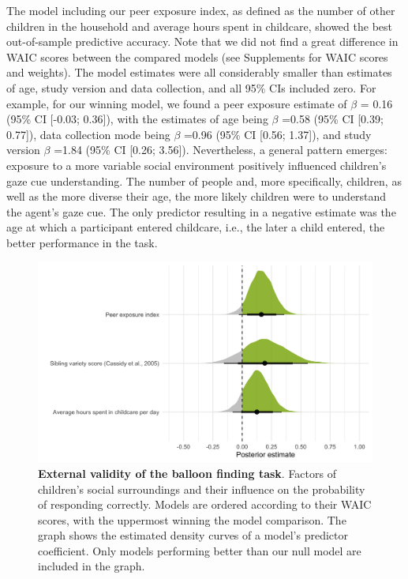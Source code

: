 \documentclass[
  man,floatsintext]{apa6}
\begin{document}
The model including our peer exposure index, as defined as the number of other children in the household and average hours spent in childcare, showed the best out-of-sample predictive accuracy. Note that we did not find a great difference in WAIC scores between the compared models (see Supplements for WAIC scores and weights). The model estimates were all considerably smaller than estimates of age, study version and data collection, and all 95\% CIs included zero. For example, for our winning model, we found a peer exposure estimate of \(\beta\) =
0.16 (95\% CI {[}-0.03; 0.36{]}),
with the estimates of age being \(\beta\) =0.58 (95\% CI {[}0.39; 0.77{]}), data collection mode being \(\beta\) =0.96 (95\% CI {[}0.56; 1.37{]}), and study version \(\beta\) =1.84 (95\% CI {[}0.26; 3.56{]}). Nevertheless, a general pattern emerges: exposure to a more variable social environment positively influenced children's gaze cue understanding. The number of people and, more specifically, children, as well as the more diverse their age, the more likely children were to understand the agent's gaze cue. The only predictor resulting in a negative estimate was the age at which a participant entered childcare, i.e., the later a child entered, the better performance in the task.




\begin{figure}

{\centering \includegraphics[width=1\linewidth]{../figures/extvali_results} 

}

\caption{\textbf{External validity of the balloon finding task}.
Factors of children's social surroundings and their influence on the probability of responding correctly. Models are ordered according to their WAIC scores, with the uppermost winning the model comparison. The graph shows the estimated density curves of a model's predictor coefficient. Only models performing better than our null model are included in the graph.}\label{fig:fig4}
\end{figure}
\end{document}
